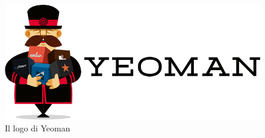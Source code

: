 \begin{figure}[h]
\centering
\includegraphics[width=0.7\linewidth]{./img/yeoman.png}
\caption[Il logo di Yeoman]{Il logo di Yeoman}
\label{fig:yeoman}
\end{figure}